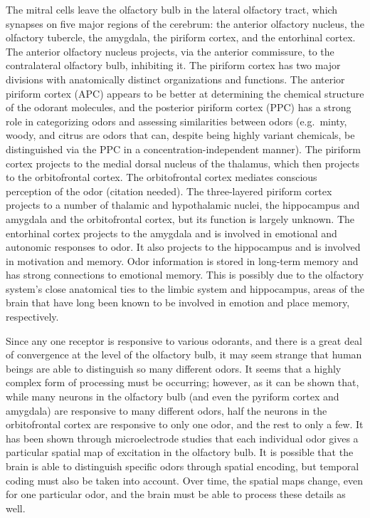 The mitral cells leave the olfactory bulb in the lateral olfactory tract, which synapses on five major regions of the cerebrum: the anterior olfactory nucleus, the olfactory tubercle, the amygdala, the piriform cortex, and the entorhinal cortex. The anterior olfactory nucleus projects, via the anterior commissure, to the contralateral olfactory bulb, inhibiting it. The piriform cortex has two major divisions with anatomically distinct organizations and functions. The anterior piriform cortex (APC) appears to be better at determining the chemical structure of the odorant molecules, and the posterior piriform cortex (PPC) has a strong role in categorizing odors and assessing similarities between odors (e.g.~minty, woody, and citrus are odors that can, despite being highly variant chemicals, be distinguished via the PPC in a concentration-independent manner). The piriform cortex projects to the medial dorsal nucleus of the thalamus, which then projects to the orbitofrontal cortex. The orbitofrontal cortex mediates conscious perception of the odor (citation needed). The three-layered piriform cortex projects to a number of thalamic and hypothalamic nuclei, the hippocampus and amygdala and the orbitofrontal cortex, but its function is largely unknown. The entorhinal cortex projects to the amygdala and is involved in emotional and autonomic responses to odor. It also projects to the hippocampus and is involved in motivation and memory. Odor information is stored in long-term memory and has strong connections to emotional memory. This is possibly due to the olfactory system's close anatomical ties to the limbic system and hippocampus, areas of the brain that have long been known to be involved in emotion and place memory, respectively.

Since any one receptor is responsive to various odorants, and there is a great deal of convergence at the level of the olfactory bulb, it may seem strange that human beings are able to distinguish so many different odors. It seems that a highly complex form of processing must be occurring; however, as it can be shown that, while many neurons in the olfactory bulb (and even the pyriform cortex and amygdala) are responsive to many different odors, half the neurons in the orbitofrontal cortex are responsive to only one odor, and the rest to only a few. It has been shown through microelectrode studies that each individual odor gives a particular spatial map of excitation in the olfactory bulb. It is possible that the brain is able to distinguish specific odors through spatial encoding, but temporal coding must also be taken into account. Over time, the spatial maps change, even for one particular odor, and the brain must be able to process these details as well.

